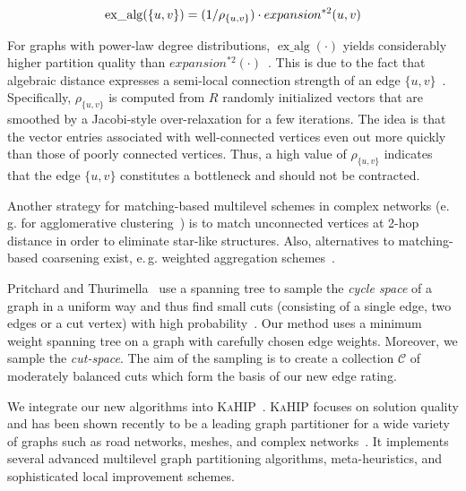\documentclass[pdftex]{llncs}
\newcommand{\eg}{e.\,g.\xspace}
\newcommand{\exalg}{\operatorname{ex\_alg}}
\newcommand{\kahip}{\textsc{KaHIP}\xspace}
\numberwithin{equation}{section}
\numberwithin{example}{section}
\numberwithin{table}{section}
\begin{document}
\begin{align}
\label{eq:expalg}
\vspace{-1ex}
\exalg(\{u, v\}) = (1/\rho_{\{u,v \}}) \cdot expansion^{*2}(u, v)
\end{align}

\noindent For graphs with power-law degree distributions, $\exalg(\cdot)$ yields
considerably higher partition quality than $expansion^{*2}(\cdot)$~\cite{Safro2012a}.
This is due to the fact that algebraic distance expresses a semi-local connection
strength of an edge $\{u, v\}$~\cite{Chen2011a}. Specifically, $\rho_{\{u, v\}}$ is
computed from $R$ randomly initialized vectors that are smoothed by a Jacobi-style
over-relaxation for a few iterations. 
The idea is that the vector entries associated with
well-connected vertices even out more quickly than those of
poorly connected vertices. Thus, a high value of $\rho_{\{u, v\}}$
indicates that the edge $\{u, v\}$ constitutes a bottleneck and should
not be contracted. 


Another strategy for matching-based multilevel schemes in complex networks 
(\eg for agglomerative clustering~\cite{Fagginger:2013gc}) is to match unconnected
vertices at 2-hop distance in order to eliminate star-like structures.
Also, alternatives to matching-based coarsening exist, \eg
weighted aggregation schemes~\cite{ChevalierS09comparison,MeyerhenkeMS09graph}.






Pritchard and Thurimella~\cite{Pritchard2011a} use a spanning tree to
sample the {\em cycle space} of a graph in a uniform way and thus find
small cuts (consisting of a single edge, two edges or a cut vertex)
with high probability~\cite{Pritchard2011a}. Our method uses a minimum
weight spanning tree on a graph with carefully chosen edge weights. Moreover,
we sample the {\em cut-space}. The aim of the
sampling is to create a collection $\mathcal{C}$ of moderately balanced
cuts which form the basis of our new edge rating.



We integrate our new algorithms into \kahip~\cite{kaHIPHomePage,sandersschulz2013}.
\kahip focuses on solution quality and has been shown recently to be
a leading graph partitioner for a wide variety of graphs such as
road networks, meshes, and complex networks~\cite{dissSchulz}.
It implements several advanced multilevel graph partitioning
algorithms, meta-heuristics, and sophisticated local improvement schemes.
\end{document}
